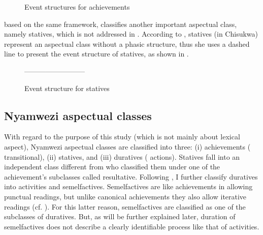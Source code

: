 \documentclass[output=paper,newtxmath,modfonts,nonflat,draftmode]{langsci/langscibook}
\begin{document}
\begin{figure}
\caption{Event structures for achievements \citep[33]{Botne2010}} 
\label{fig:kanijo:3}
\end{figure}


\citet[62]{Kershner2002} based on the same framework, classifies another important aspectual class, namely statives, which is not addressed in \citet{Botne2010}. According to \citet{Kershner2002}, statives (in Chisukwa) represent an aspectual class without a phasic structure, thus she uses a dashed line to present the event structure of statives, as shown in . 

\begin{figure}
--------------------------
\caption{Event structure for statives \citep[62]{Kershner2002}\label{fig:kanijo:4}}
\end{figure}

\subsection{Nyamwezi aspectual classes}\label{sec:kanijo:3.2}\largerpage[-3]

With regard to the purpose of this study (which is not mainly about lexical aspect), Nyamwezi aspectual classes are classified into three: (i) achievements ( transitional), (ii) statives, and (iii) duratives ( actions). Statives fall into an independent class different from \citet{Botne2010} who classified them under one of the achievement’s subclasses called resultative. Following \citet{Botne2010}, I further classify duratives into activities and semelfactives. Semelfactives are like achievements in allowing punctual readings, but unlike canonical achievements they also allow iterative readings (cf. \citealt{Kearns2000}). For this latter reason, semelfactives are classified as one of the subclasses of duratives. But, as will be further explained later, duration of semelfactives does not describe a clearly identifiable process like that of activities. 
\end{document}
